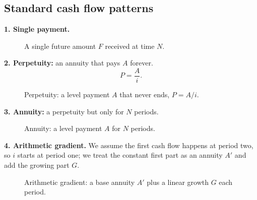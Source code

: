 \documentclass[11pt]{article}
\newcommand{\cfaxis}[1]{\draw[-{Latex[length=2mm]},thick] (-0.3,0) -- (#1,0);}
\newcommand{\up}[3]{\draw[-{Latex[length=2mm]},very thick,posflow] (#1,0) -- (#1,#2) node[above]{\small #3};}
\newcommand{\dn}[3]{\draw[-{Latex[length=2mm]},very thick,negflow] (#1,0) -- (#1,-#2) node[below]{\small #3};}
\newcommand{\tick}[2]{\fill (#1,0) circle (1.3pt); \node[below=2pt] at (#1,0) {\small #2};}
\begin{document}
\subsection*{Standard cash flow patterns}

\textbf{1. Single payment.}
\begin{figure}[h]
\centering
{}
\caption*{A single future amount $F$ received at time $N$.}
\end{figure}

\textbf{2. Perpetuity:} an annuity that pays $A$ forever.
\[
P = \frac{A}{i}.
\]
\begin{figure}[h]
\centering
{}
\caption*{Perpetuity: a level payment $A$ that never ends, $P=A/i$.}
\end{figure}

\textbf{3. Annuity:} a perpetuity but only for $N$ periods.
\begin{figure}[h]
\centering
{}
\caption*{Annuity: a level payment $A$ for $N$ periods.}
\end{figure}

\textbf{4. Arithmetic gradient.} We assume the first cash flow happens at period
two, so $i$ starts at period one; we treat the constant first part as an annuity
$A'$ and add the growing part $G$.
\begin{figure}[h]
\centering
{}
\caption*{Arithmetic gradient: a base annuity $A'$ plus a linear growth $G$ each period.}
\end{figure}
\end{document}
